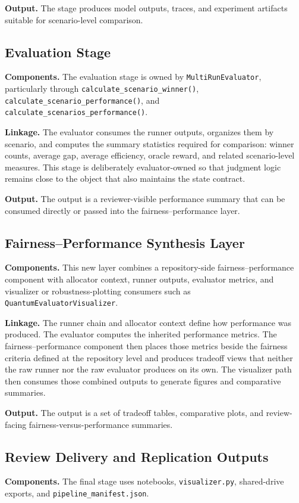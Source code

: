 \documentclass{IEEEtran}
\begin{document}
\textbf{Output.} The stage produces model outputs, traces, and experiment
artifacts suitable for scenario-level comparison.

\subsection{Evaluation Stage}
\textbf{Components.} The evaluation stage is owned by
\texttt{MultiRunEvaluator}, particularly through
\texttt{calculate\_scenario\_winner()},
\texttt{calculate\_scenario\_performance()}, and
\texttt{calculate\_scenarios\_performance()}.

\textbf{Linkage.} The evaluator consumes the runner outputs, organizes them by
scenario, and computes the summary statistics required for comparison: winner
counts, average gap, average efficiency, oracle reward, and related
scenario-level measures. This stage is deliberately evaluator-owned so that
judgment logic remains close to the object that also maintains the state
contract.

\textbf{Output.} The output is a reviewer-visible performance summary that can
be consumed directly or passed into the fairness--performance layer.

\subsection{Fairness--Performance Synthesis Layer}
\textbf{Components.} This new layer combines a repository-side
fairness--performance component with allocator context, runner outputs,
evaluator metrics, and visualizer or robustness-plotting consumers such as
\texttt{QuantumEvaluatorVisualizer}.

\textbf{Linkage.} The runner chain and allocator context define how
performance was produced. The evaluator computes the inherited performance
metrics. The fairness--performance component then places those metrics beside
the fairness criteria defined at the repository level and produces tradeoff
views that neither the raw runner nor the raw evaluator produces on its own.
The visualizer path then consumes those combined outputs to generate figures and
comparative summaries.

\textbf{Output.} The output is a set of tradeoff tables, comparative plots, and
review-facing fairness-versus-performance summaries.

\subsection{Review Delivery and Replication Outputs}
\textbf{Components.} The final stage uses notebooks, \texttt{visualizer.py},
shared-drive exports, and \texttt{pipeline\_manifest.json}.
\end{document}
